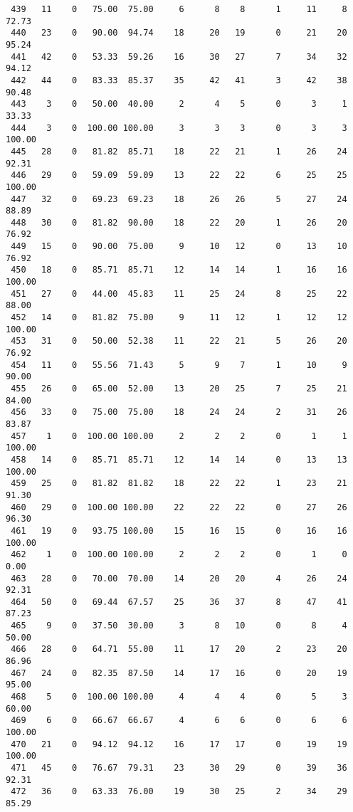 \begin{verbatim}
 439   11    0   75.00  75.00     6      8    8      1     11     8    72.73
 440   23    0   90.00  94.74    18     20   19      0     21    20    95.24
 441   42    0   53.33  59.26    16     30   27      7     34    32    94.12
 442   44    0   83.33  85.37    35     42   41      3     42    38    90.48
 443    3    0   50.00  40.00     2      4    5      0      3     1    33.33
 444    3    0  100.00 100.00     3      3    3      0      3     3   100.00
 445   28    0   81.82  85.71    18     22   21      1     26    24    92.31
 446   29    0   59.09  59.09    13     22   22      6     25    25   100.00
 447   32    0   69.23  69.23    18     26   26      5     27    24    88.89
 448   30    0   81.82  90.00    18     22   20      1     26    20    76.92
 449   15    0   90.00  75.00     9     10   12      0     13    10    76.92
 450   18    0   85.71  85.71    12     14   14      1     16    16   100.00
 451   27    0   44.00  45.83    11     25   24      8     25    22    88.00
 452   14    0   81.82  75.00     9     11   12      1     12    12   100.00
 453   31    0   50.00  52.38    11     22   21      5     26    20    76.92
 454   11    0   55.56  71.43     5      9    7      1     10     9    90.00
 455   26    0   65.00  52.00    13     20   25      7     25    21    84.00
 456   33    0   75.00  75.00    18     24   24      2     31    26    83.87
 457    1    0  100.00 100.00     2      2    2      0      1     1   100.00
 458   14    0   85.71  85.71    12     14   14      0     13    13   100.00
 459   25    0   81.82  81.82    18     22   22      1     23    21    91.30
 460   29    0  100.00 100.00    22     22   22      0     27    26    96.30
 461   19    0   93.75 100.00    15     16   15      0     16    16   100.00
 462    1    0  100.00 100.00     2      2    2      0      1     0     0.00
 463   28    0   70.00  70.00    14     20   20      4     26    24    92.31
 464   50    0   69.44  67.57    25     36   37      8     47    41    87.23
 465    9    0   37.50  30.00     3      8   10      0      8     4    50.00
 466   28    0   64.71  55.00    11     17   20      2     23    20    86.96
 467   24    0   82.35  87.50    14     17   16      0     20    19    95.00
 468    5    0  100.00 100.00     4      4    4      0      5     3    60.00
 469    6    0   66.67  66.67     4      6    6      0      6     6   100.00
 470   21    0   94.12  94.12    16     17   17      0     19    19   100.00
 471   45    0   76.67  79.31    23     30   29      0     39    36    92.31
 472   36    0   63.33  76.00    19     30   25      2     34    29    85.29

\end{verbatim}
